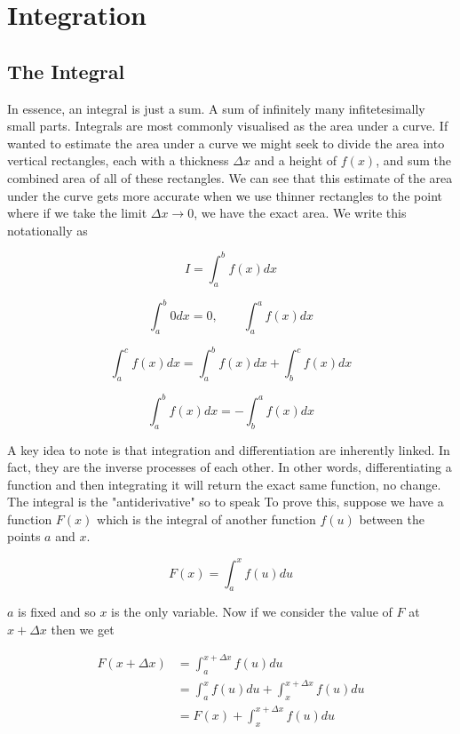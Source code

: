 \chapter{Integration}
\section{The Integral}

In essence, an integral is just a sum. A sum of infinitely many infitetesimally small parts.
Integrals are most commonly visualised as the area under a curve. If wanted to estimate the
area under a curve we might seek to divide the area into vertical rectangles, each with a 
thickness $\Delta x$ and a height of $f(x)$, and sum the combined area of all of these rectangles. 
We can see that this estimate of the area under the curve gets more accurate when we use 
thinner rectangles to the point where if we take the limit $\Delta x \to 0$, we have the 
exact area. We write this notationally as 

\begin{equation*}
    I = \int_{a}^{b} f(x)dx
\end{equation*}

\[\int_{a}^{b}0dx = 0, \qquad \int_{a}^{a}f(x)dx\]

\begin{equation*}
    \int_{a}^{c}f(x)dx = \int_{a}^{b}f(x)dx + \int_{b}^{c}f(x)dx
\end{equation*}

\begin{equation*}
    \int_{a}^{b}f(x)dx = - \int_{b}^{a}f(x)dx
\end{equation*}

A key idea to note is that integration and differentiation are inherently linked. In fact,
they are the inverse processes of each other. In other words, differentiating a function and 
then integrating it will return the exact same function, no change. The integral is the 
"antiderivative" so to speak To prove this, suppose we have a function $F(x)$ which is the 
integral of another function $f(u)$ between the points $a$ and $x$.

\begin{equation*}
    F(x) = \int_{a}^{x}f(u)du
\end{equation*}

$a$ is fixed and so $x$ is the only variable. Now if we consider the value of $F$ at $x + \Delta x$
then we get

\begin{align*}
    F(x + \Delta x) &= \int_{a}^{x + \Delta x}f(u)du\\
    &= \int_{a}^{x}f(u)du + \int_{x}^{x + \Delta x}f(u)du\\
    &= F(x) + \int_{x}^{x + \Delta x}f(u)du\\
\end{align*}

